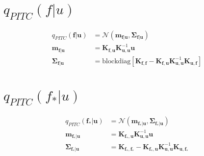 \documentclass[12pt, landscape]{article}
\begin{document}
\section{$q_{PITC}(f|u)$}
\begingroup\makeatletter{}\check@mathfonts
\def\maketag@@@#1{\hbox{\m@th\large\normalfont#1}}
\begin{align*}
q_{PITC}\left(\mathbf{f}|\mathbf{u}\right)&= \mathcal{N}\left(\mathbf{m}_{\mathbf{f}|\mathbf{u}},\mathbf{\Sigma}_{\mathbf{f}|\mathbf{u}}\right)\\
\mathbf{m}_{\mathbf{f}|\mathbf{u}} &= \mathbf{K}_{\mathbf{f},\mathbf{u}} \mathbf{K}_{\mathbf{u},\mathbf{u}}^{-1} \mathbf{u}\\
\mathbf{\Sigma}_{\mathbf{f}|\mathbf{u}} &= \text{blockdiag}[\mathbf{K}_{\mathbf{f},\mathbf{f}} - \mathbf{K}_{\mathbf{f},\mathbf{u}} \mathbf{K}_{\mathbf{u},\mathbf{u}}^{-1} \mathbf{K}_{\mathbf{u},\mathbf{f}}]\\
\end{align*}\endgroup

\section{$q_{PITC}(f_{*}|u)$}
\begingroup\makeatletter{}\check@mathfonts
\def\maketag@@@#1{\hbox{\m@th\large\normalfont#1}}
\begin{align*}
q_{PITC}\left(\mathbf{f_{*}}|\mathbf{u}\right)&= \mathcal{N}\left(\mathbf{m}_{\mathbf{f_{*}}|\mathbf{u}},\mathbf{\Sigma}_{\mathbf{f_{*}}|\mathbf{u}}\right)\\
\mathbf{m}_{\mathbf{f_{*}}|\mathbf{u}} &= \mathbf{K}_{\mathbf{f_{*}},\mathbf{u}} \mathbf{K}_{\mathbf{u},\mathbf{u}}^{-1} \mathbf{u}\\
\mathbf{\Sigma}_{\mathbf{f_{*}}|\mathbf{u}} &= \mathbf{K}_{\mathbf{f_{*}},\mathbf{f_{*}}} - \mathbf{K}_{\mathbf{f_{*}},\mathbf{u}} \mathbf{K}_{\mathbf{u},\mathbf{u}}^{-1} \mathbf{K}_{\mathbf{u},\mathbf{f_{*}}}\\
\end{align*}\endgroup
\end{document}
